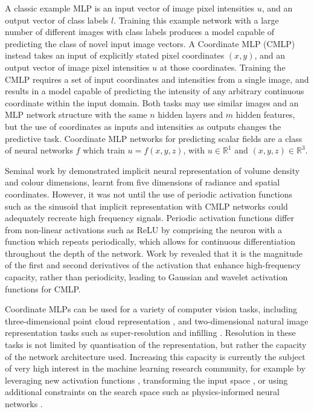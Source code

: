\documentclass[manuscript.tex]{subfiles}
\begin{document}
A classic example MLP is an input vector of image pixel intensities \(u\), and an output vector of class labels \(l\). %
Training this example network with a large number of different images with class labels produces a model capable of predicting the class of novel input image vectors.
A Coordinate MLP (CMLP) instead takes an input of explicitly stated pixel coordinates \((x,y)\), and an output vector of image pixel intensities \(u\) at those coordinates.
Training the CMLP requires a set of input coordinates and intensities from a single image, and results in a model capable of predicting the intensity of any arbitrary continuous coordinate within the input domain.
Both tasks may use similar images and an MLP network structure with the same \(n\) hidden layers and \(m\) hidden features, but the use of coordinates as inputs and intensities as outputs changes the predictive task.
Coordinate MLP networks for predicting scalar fields are a class of neural networks \(f\) which train \(u = f(x,y,z)\), with \(u\in\mathbb{R}^1\) and \((x,y,z)\in\mathbb{R}^3\).

Seminal work by \parencite{mildenhallNeRFRepresentingScenes2020} demonstrated implicit neural representation of volume density and colour dimensions, learnt from five dimensions of radiance and spatial coordinates.
However, it was not until the use of periodic activation functions such as the sinusoid \parencite{sitzmann2019siren} that implicit representation with CMLP networks could adequately recreate high frequency signals.
Periodic activation functions differ from non-linear activations such as ReLU by comprising the neuron with a function which repeats periodically, which allows for continuous differentiation throughout the depth of the network.
Work by \parencite{ramasinghePeriodicityUnifyingFramework2022} revealed that it is the magnitude of the first and second derivatives of the activation that enhance high-frequency capacity, rather than periodicity, leading to Gaussian \parencite{ramasinghePeriodicityUnifyingFramework2022} and wavelet \parencite{saragadamWIREWaveletImplicit2023} activation functions for CMLP\@.

Coordinate MLPs can be used for a variety of computer vision tasks, including three-dimensional point cloud representation \parencite{qiPointNetDeepHierarchical2017}, and two-dimensional natural image representation tasks such as super-resolution and infilling \parencite{leeLocalTextureEstimator2022,chenLearningContinuousImage2021}.
Resolution in these tasks is not limited by quantisation of the representation, but rather the capacity of the network architecture used.
Increasing this capacity is currently the subject of very high interest in the machine learning research community, for example by leveraging new activation functions \parencite{saragadamWIREWaveletImplicit2023}, transforming the input space \parencite[e.g.][]{benbarkaSeeingImplicitNeural2022}, or using additional constraints on the search space such as physics-informed neural networks \parencite{raissiPhysicsinformedNeuralNetworks2019}.
\end{document}
